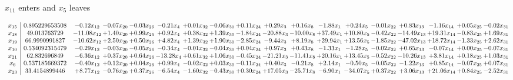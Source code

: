 \documentclass[9pt]{article}
\begin{document}
 $ x_{11} $ enters and $ x_{5} $ leaves 

 \[\begin{array}{c| c c@{\hskip 2pt} c@{\hskip 2pt} c@{\hskip 2pt} c@{\hskip 2pt} c@{\hskip 2pt} c@{\hskip 2pt} c@{\hskip 2pt} c@{\hskip 2pt} c@{\hskip 2pt} c@{\hskip 2pt} c@{\hskip 2pt} c@{\hskip 2pt} c@{\hskip 2pt} c@{\hskip 2pt} c@{\hskip 2pt} c@{\hskip 2pt} }
 x_{15}   &  0.895229653508 & -0.12 x_{12} & -0.07 x_{20} & -0.03 x_{26} & -0.21 x_{4} & +  0.01 x_{32} & -0.06 x_{30} & +  0.11 x_{24} & +  0.29 x_{3} & +  0.16 x_{8} & -1.88 x_{1} & +  0.24 x_{5} & -0.01 x_{22} & +  0.83 x_{13} & -1.16 x_{14} & +  0.05 x_{25} & -0.02 x_{31}\\
 x_{18}   &  49.013763729 & -11.08 x_{12} & +  1.40 x_{20} & +  0.99 x_{26} & +  0.92 x_{4} & +  0.38 x_{32} & +  1.39 x_{30} & -1.84 x_{24} & -20.88 x_{3} & -10.00 x_{8} & + 37.49 x_{1} & + 10.80 x_{5} & -0.42 x_{22} & -14.49 x_{13} & + 19.31 x_{14} & -0.83 x_{25} & +  1.69 x_{31}\\
 x_{19}   &  66.9990991827 & -10.62 x_{12} & +  2.50 x_{20} & +  0.50 x_{26} & +  4.82 x_{4} & +  1.39 x_{32} & +  1.90 x_{30} & -2.85 x_{24} & -9.44 x_{3} & +  8.19 x_{8} & + 29.94 x_{1} & + 13.56 x_{5} & -1.85 x_{22} & -47.02 x_{13} & + 18.72 x_{14} & -1.33 x_{25} & +  2.62 x_{31}\\
 x_{10}   &  0.534092315479 & -0.29 x_{12} & -0.03 x_{20} & -0.05 x_{26} & -0.34 x_{4} & -0.01 x_{32} & -0.04 x_{30} & +  0.04 x_{24} & +  0.97 x_{3} & +  0.43 x_{8} & -1.33 x_{1} & -1.28 x_{5} & -0.02 x_{22} & +  0.65 x_{13} & -0.07 x_{14} & +  0.00 x_{25} & -0.07 x_{31}\\
 x_{21}   &  62.832696849 & -6.36 x_{12} & +  0.37 x_{20} & +  0.64 x_{26} & -13.28 x_{4} & +  0.61 x_{32} & +  1.06 x_{30} & -0.45 x_{24} & -21.21 x_{3} & -11.41 x_{8} & + 20.16 x_{1} & + 13.45 x_{5} & -0.52 x_{22} & -10.26 x_{13} & +  3.81 x_{14} & +  0.18 x_{25} & +  1.03 x_{31}\\
 x_{6}   &  0.537185669372 & -0.40 x_{12} & +  0.12 x_{20} & +  0.04 x_{26} & +  0.99 x_{4} & -0.02 x_{32} & +  0.03 x_{30} & -0.11 x_{24} & +  0.40 x_{3} & -0.21 x_{8} & +  2.14 x_{1} & -0.50 x_{5} & -0.05 x_{22} & -1.22 x_{13} & +  0.85 x_{14} & -0.07 x_{25} & +  0.07 x_{31}\\
 x_{23}   &  33.4154899446 & +  8.77 x_{12} & -0.76 x_{20} & +  0.37 x_{26} & -6.54 x_{4} & -1.60 x_{32} & -0.43 x_{30} & +  0.30 x_{24} & + 17.05 x_{3} & -25.71 x_{8} & -6.90 x_{1} & -34.07 x_{5} & +  0.37 x_{22} & +  3.06 x_{13} & + 21.06 x_{14} & +  0.84 x_{25} & -2.52 x_{31}\\

\end{array}\]
\end{document}

